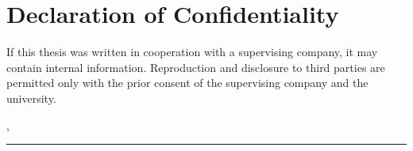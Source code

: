 \section*{Declaration of Confidentiality}
If this thesis was written in cooperation with a supervising company, it may contain internal information. 
Reproduction and disclosure to third parties are permitted only with the prior consent of the supervising company and the university.

\vspace{2.5cm}

\noindent\ThesisLocation, \ThesisSubmissionDate\\[1.2cm]
\noindent\rule{6cm}{0.4pt}\\
\ThesisAuthor
